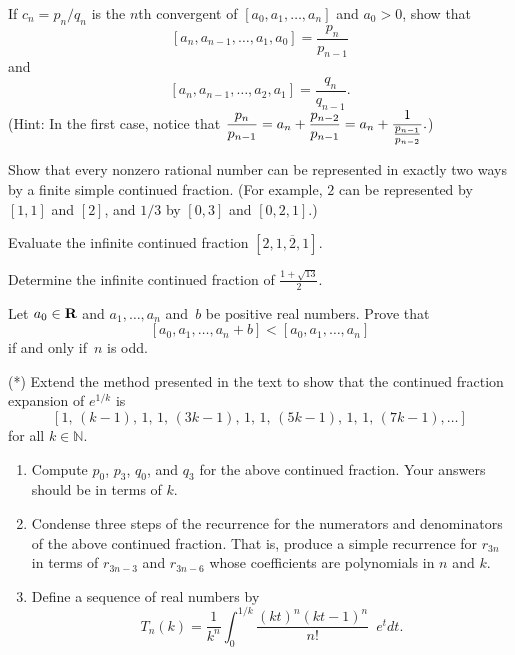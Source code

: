 \begin{exercises}

\item\label{ex:cf2}
If $c_n=p_n/q_n$ is the $n$th convergent of
$[a_0,a_1,\ldots,a_n]$ and $a_0>0$, show that
$$
  [a_n,a_{n-1},\ldots, a_1, a_0] = \frac{p_n}{p_{n-1}}
$$
and
$$
   [a_n,a_{n-1},\ldots, a_2, a_1] = \frac{q_n}{q_{n-1}}.
$$
(Hint: In the first case, notice that
$\displaystyle \frac{p_n}{p_{n-1}} = a_n + \frac{p_{n-2}}{p_{n-1}}
          = a_n + \frac{1}{\frac{p_{n-1}}{p_{n-2}}}.$)

\item\label{ex:cf3b}
Show that every nonzero rational number can be represented in
exactly two ways by a finite simple continued fraction.  (For
example, $2$ can be represented by $[1,1]$ and $[2]$, and $1/3$
by $[0,3]$ and $[0,2,1]$.)

\item\label{ex:cf4}
Evaluate the infinite continued fraction $[2,\overline{1,2,1}]$.

\item\label{ex:cf5}
Determine the infinite continued fraction of $\frac{1+\sqrt{13}}{2}$.

\item Let $a_0\in\mathbf{R}$ and $a_1,\ldots,a_n$ and~$b$ be positive
real numbers.  Prove that
$$
  [a_0,a_1,\ldots,a_n+b] < [a_0,a_1,\ldots,a_n]
$$
if and only if~$n$ is odd.



\item (*) \label{ex:contfrac_epow} Extend the method presented in the text
to show that the continued fraction expansion of $e^{1/k}$ is
$$
  [1,\,(k-1),\,1,\,1,\,(3k-1),\,1,\,1,\,(5k-1),\,1,\,1,\,(7k-1),\ldots]
$$
for all $k \in
\mathbb{N}$.

\begin{enumerate}
\item
Compute $p_0$, $p_3$, $q_0$, and $q_3$ for the above continued fraction. Your answers should be in terms of $k$.

\item\label{condense}
Condense three steps of the recurrence for the numerators and denominators of the above continued fraction. That is, produce a simple recurrence for $r_{3n}$ in terms of $r_{3n-3}$ and $r_{3n-6}$ whose coefficients are polynomials in $n$ and $k$.

\item
Define a sequence of real numbers by
$$T_n(k)=\frac{1}{k^n}\int_{0}^{1/k}\frac{(kt)^{n}(kt-1)^{n}}{n!}\phantom{1} e^tdt.$$


\end{enumerate}
\end{exercises}
